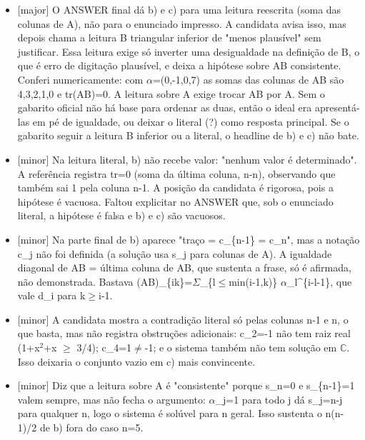 \documentclass{article}%
\begin{document}
\begin{itemize}%
\item%
{[}major{]} O ANSWER final dá b) e c) para uma leitura reescrita (soma das colunas de A), não para o enunciado impresso. A candidata avisa isso, mas depois chama a leitura B triangular inferior de "menos plausível" sem justificar. Essa leitura exige só inverter uma desigualdade na definição de B, o que é erro de digitação plausível, e deixa a hipótese sobre AB consistente. Conferi numericamente: com $\alpha$=(0,-1,0,7) as somas das colunas de AB são 4,3,2,1,0 e tr(AB)=0. A leitura sobre A exige trocar AB por A. Sem o gabarito oficial não há base para ordenar as duas, então o ideal era apresentá{-}las em pé de igualdade, ou deixar o literal (?) como resposta principal. Se o gabarito seguir a leitura B inferior ou a literal, o headline de b) e c) não bate.%
\item%
{[}minor{]} Na leitura literal, b) não recebe valor: "nenhum valor é determinado". A referência registra tr=0 (soma da última coluna, n-n), observando que também sai 1 pela coluna n-1. A posição da candidata é rigorosa, pois a hipótese é vacuosa. Faltou explicitar no ANSWER que, sob o enunciado literal, a hipótese é falsa e b) e c) são vacuosos.%
\item%
{[}minor{]} Na parte final de b) aparece "traço = c\_\{n{-}1\} = c\_n", mas a notação c\_j não foi definida (a solução usa s\_j para colunas de A). A igualdade diagonal de AB = última coluna de AB, que sustenta a frase, só é afirmada, não demonstrada. Bastava (AB)\_\{ik\}=$\Sigma$\_\{l$\leq$min(i-1,k)\} $\alpha$\_l\^{}\{i-l-1\}, que vale d\_i para k$\geq$i-1.%
\item%
{[}minor{]} A candidata mostra a contradição literal só pelas colunas n-1 e n, o que basta, mas não registra obstruções adicionais: c\_2=-1 não tem raiz real (1+x$^2$+x $\geq$ 3/4); c\_4=1$\neq$-1; e o sistema também não tem solução em $\mathbb{C}$. Isso deixaria o conjunto vazio em c) mais convincente.%
\item%
{[}minor{]} Diz que a leitura sobre A é "consistente" porque s\_n=0 e s\_\{n-1\}=1 valem sempre, mas não fecha o argumento: $\alpha$\_j=1 para todo j dá s\_j=n-j para qualquer n, logo o sistema é solúvel para n geral. Isso sustenta o n(n-1)/2 de b) fora do caso n=5.%
\end{itemize}%
\end{document}

